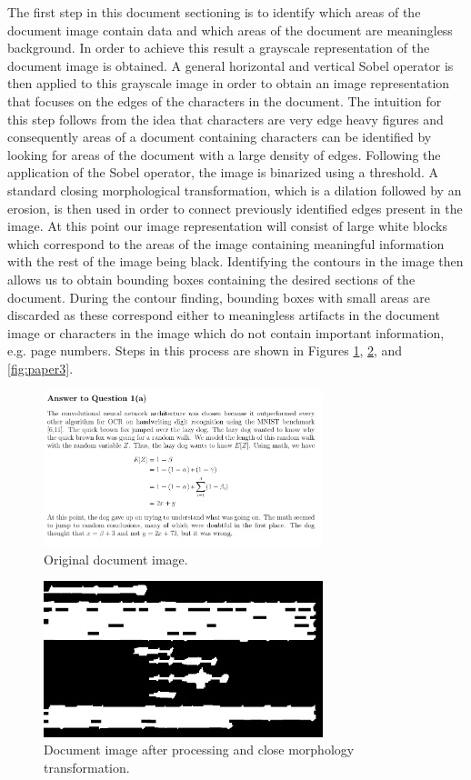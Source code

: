\documentclass[10pt]{IEEEtran}
\begin{document}
The first step in this document sectioning is to identify which areas of the document image contain data and which areas of the document are meaningless background. In order to achieve this result a grayscale representation of the document image is obtained. A general horizontal and vertical Sobel operator is then applied to this grayscale image in order to obtain an image representation that focuses on the edges of the characters in the document. The intuition for this step follows from the idea that characters are very edge heavy figures and consequently areas of a document containing characters can be identified by looking for areas of the document with a large density of edges. Following the application of the Sobel operator, the image is binarized using a threshold. A standard closing morphological transformation, which is a dilation followed by an erosion, is then used in order to connect previously identified edges present in the image. At this point our image representation will consist of large white blocks which correspond to the areas of the image containing meaningful information with the rest of the image being black. Identifying the contours in the image then allows us to obtain bounding boxes containing the desired sections of the document. During the contour finding, bounding boxes with small areas are discarded as these correspond either to meaningless artifacts in the document image or characters in the image which do not contain important information, e.g. page numbers. Steps in this process are shown in Figures \ref{fig:paper1}, \ref{fig:paper2}, and \ref{fig:paper3}.

\begin{figure}[h]
  \centering
    \includegraphics[width=3.2in]{paper1.png}
  \caption{Original document image.}
  \label{fig:paper1}
\end{figure}

\begin{figure}[h]
  \centering
    \includegraphics[width=3.2in]{paper1-morph.png}
  \caption{Document image after processing and close morphology transformation.}
  \label{fig:paper2}
\end{figure}
\end{document}
